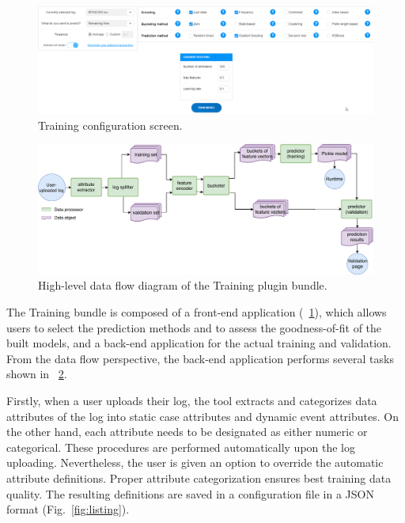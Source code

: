 \documentclass[runningheads,a4paper]{llncs}
\begin{document}
\begin{figure}[t!]%
	\centering
	 \includegraphics[width=\textwidth]{img/nirdizati-frontend2}
	\caption{Training configuration screen.}
	\label{fig:nirdizati-frontend}
	\vspace{-0.5\baselineskip}
\end{figure}
\begin{figure}[b!]%
	\centering
	 \includegraphics[width=\textwidth]{img/training-dataflow}
	\caption{High-level data flow diagram of the Training plugin bundle.}
	\label{fig:nirdizati-training}
	\end{figure}
The Training bundle is composed of a front-end application (\figurename~\ref{fig:nirdizati-frontend}), which allows users to select the prediction methods
and to assess the goodness-of-fit of the built models, and a back-end application  for the actual training and validation. From the data flow perspective, the back-end application performs several tasks shown in \figurename~\ref{fig:nirdizati-training}.

Firstly, when a user uploads their log, the tool extracts and categorizes data attributes of the log into static case attributes and dynamic event attributes. On the other hand, each attribute needs to be designated as either numeric or categorical. These procedures are performed automatically upon the log uploading. Nevertheless, the user is given an option to override the automatic attribute definitions. Proper attribute categorization ensures best training data quality. 
The resulting definitions are saved in a configuration file in a JSON format (Fig.~\ref{fig:listing}).
\end{document}

